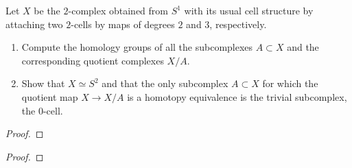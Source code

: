 \begin{problem}[Hatcher {\S}2.2, Ex.\@ 13]
Let $X$ be the $2$-complex obtained from $S^1$ with its usual cell
structure by attaching two $2$-cells by maps of degrees $2$ and $3$,
respectively.
\begin{enumerate}[label=(\alph*)]
\item Compute the homology groups of all the subcomplexes $A\subset X$ and
  the corresponding quotient complexes $X/A$.
\item Show that $X\simeq S^2$ and that the only subcomplex $A\subset X$ for
  which the quotient map $X\to X/A$ is a homotopy equivalence is the
  trivial subcomplex, the $0$-cell.
\end{enumerate}
\end{problem}
\begin{proof}

\end{proof}
\newpage

\begin{problem}
\end{problem}
\begin{proof}
\end{proof}

